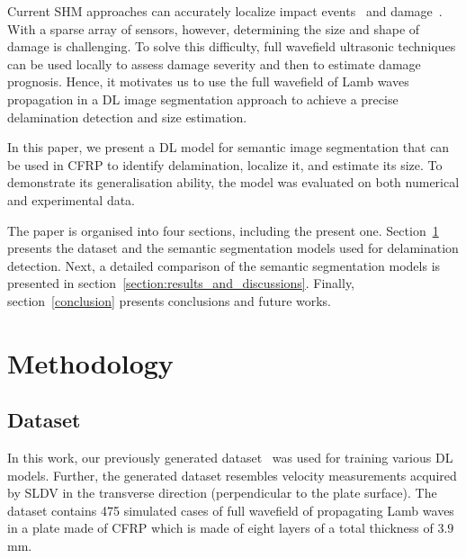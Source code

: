 \documentclass[runningheads]{llncs}
\begin{document}
Current SHM approaches can accurately localize impact events~\cite{Ciampa2012} and damage~\cite{Nokhbatolfoghahai2020}.
With a sparse array of sensors, however, determining the size and shape of damage is challenging.
To solve this difficulty, full wavefield ultrasonic techniques can be used locally to assess damage severity and then to estimate damage prognosis.
Hence, it motivates us to use the full wavefield of Lamb waves propagation in a DL image segmentation approach to achieve a precise delamination detection and size estimation.

In this paper, we present a DL model for semantic image segmentation that can be used in CFRP to identify delamination, localize it, and estimate its size.
To demonstrate its generalisation ability, the model was evaluated on both numerical and experimental data.

The paper is organised into four sections, including the present one.
Section~\ref{methodology} presents the dataset and the semantic segmentation models used for delamination detection. 
Next, a detailed comparison of the semantic segmentation models is presented in section~\ref{section:results_and_discussions}.
Finally, section~\ref{conclusion} presents conclusions and future works.
\section{Methodology}
\label{methodology}
\subsection{Dataset}
In this work, our previously generated dataset~\cite{Ijjeh2021} was used for training various DL models.
Further, the generated dataset resembles velocity measurements acquired by SLDV in the transverse direction (perpendicular to the plate surface).
The dataset contains 475 simulated cases of full wavefield of propagating Lamb waves in a plate made of CFRP which is made of eight layers of a total thickness of \(3.9\) mm.
\end{document}
